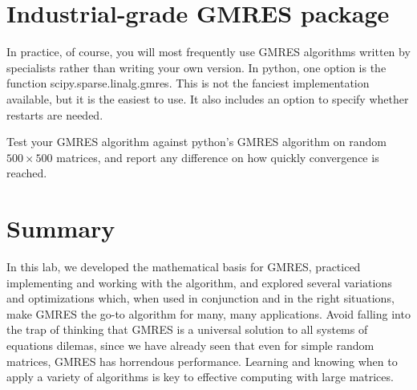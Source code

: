 \section*{Industrial-grade GMRES package}
In practice, of course, you will most frequently use GMRES algorithms written by specialists rather than writing your own version.
In python, one option is the function scipy.sparse.linalg.gmres.
This is not the fanciest implementation available, but it is the easiest to use.
It also includes an option to specify whether restarts are needed.

\begin{problem}
\label{prob:GMRES4}
Test your GMRES algorithm against python's GMRES algorithm on random $500\times 500$ matrices, and report any difference on how quickly convergence is reached.
\end{problem}

\section*{Summary}
In this lab, we developed the mathematical basis for GMRES, practiced implementing and working with the algorithm, and explored several variations and optimizations which, when used in conjunction and in the right situations, make GMRES the go-to algorithm for many, many applications.
Avoid falling into the trap of thinking that GMRES is a universal solution to all systems of equations dilemas, since we have already seen that even for simple random matrices, GMRES has horrendous performance.
Learning and knowing when to apply a variety of algorithms is key to effective computing with large matrices.
